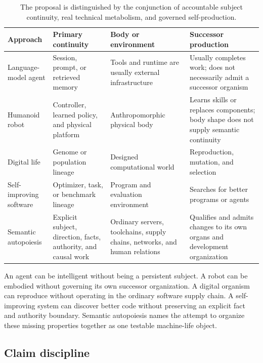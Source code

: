 \begin{table}[ht]
\centering
\footnotesize
\begin{tabularx}{\textwidth}{@{}
  >{\raggedright\arraybackslash}p{}
  >{\raggedright\arraybackslash}p{}
  >{\raggedright\arraybackslash}p{}
  >{\raggedright\arraybackslash}X@{}}
\toprule
\textbf{Approach} & \textbf{Primary continuity} & \textbf{Body or environment} & \textbf{Successor production} \\
\midrule
Language-model agent & Session, prompt, or retrieved memory & Tools and runtime are usually external infrastructure & Usually completes work; does not necessarily admit a successor organism \\
Humanoid robot & Controller, learned policy, and physical platform & Anthropomorphic physical body & Learns skills or replaces components; body shape does not supply semantic continuity \\
Digital life & Genome or population lineage & Designed computational world & Reproduction, mutation, and selection \\
Self-improving software & Optimizer, task, or benchmark lineage & Program and evaluation environment & Searches for better programs or agents \\
Semantic autopoiesis & Explicit subject, direction, facts, authority, and causal work & Ordinary servers, toolchains, supply chains, networks, and human relations & Qualifies and admits changes to its own organs and development organization \\
\bottomrule
\end{tabularx}
\caption{The proposal is distinguished by the conjunction of accountable
subject continuity, real technical metabolism, and governed self-production.}
\label{tab:distinction}
\end{table}

An agent can be intelligent without being a persistent subject. A robot can
be embodied without governing its own successor organization. A digital
organism can reproduce without operating in the ordinary software supply
chain. A self-improving system can discover better code without preserving an
explicit fact and authority boundary. Semantic autopoiesis names the attempt
to organize these missing properties together as one testable machine-life
object.

\subsection{Claim discipline}

